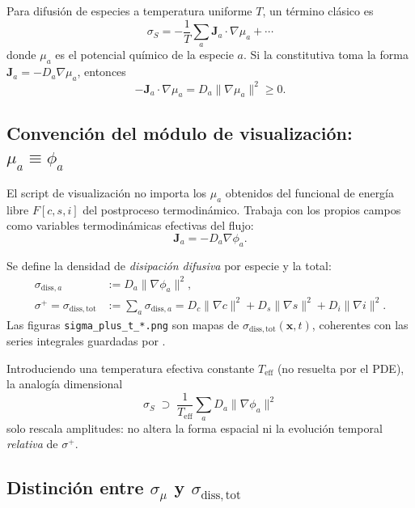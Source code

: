 \documentclass[11pt,a4paper]{article}
\newcommand{\vect}[1]{\mathbf{#1}}
\begin{document}
Para difusión de especies a temperatura uniforme $T$, un término clásico es
\begin{equation}
\label{eq:sigmaS-diff}
\sigma_S = -\frac{1}{T}\sum_a \vect{J}_a\cdot\nabla\mu_a + \cdots
\end{equation}
donde $\mu_a$ es el potencial químico de la especie $a$. Si la constitutiva toma
la forma $\vect{J}_a=-D_a\nabla\mu_a$, entonces
\begin{equation}
\label{eq:Ja-mu}
-\vect{J}_a\cdot\nabla\mu_a = D_a \lVert\nabla\mu_a\rVert^2 \ge 0 .
\end{equation}

\subsection{Convención del módulo de visualización: $\mu_a\equiv\phi_a$}

El script de visualización no importa los $\mu_a$ obtenidos del funcional de
energía libre $F[c,s,i]$ del postproceso termodinámico. Trabaja con los propios
campos como variables termodinámicas efectivas del flujo:
\begin{equation}
\label{eq:Ja-phi}
\vect{J}_a = -D_a \nabla \phi_a .
\end{equation}

Se define la densidad de \emph{disipación difusiva} por especie y la total:
\begin{align}
\label{eq:sigma-diss-a}
\sigma_{\mathrm{diss},a} &:= D_a \lVert\nabla\phi_a\rVert^2 ,\\
\label{eq:sigma-plus}
\sigma^{+} = \sigma_{\mathrm{diss,tot}}
&:= \sum_a \sigma_{\mathrm{diss},a}
= D_c\lVert\nabla c\rVert^2 + D_s\lVert\nabla s\rVert^2 + D_i\lVert\nabla i\rVert^2 .
\end{align}
Las figuras \texttt{sigma\_plus\_t\_*.png} son mapas de $\sigma_{\mathrm{diss,tot}}(\vect{x},t)$,
coherentes con las series integrales guardadas por
.

Introduciendo una temperatura efectiva constante $T_{\mathrm{eff}}$ (no
resuelta por el PDE), la analogía dimensional
\begin{equation}
\label{eq:sigmaS-supset}
\sigma_S \;\supset\; \frac{1}{T_{\mathrm{eff}}}\sum_a D_a\lVert\nabla\phi_a\rVert^2
\end{equation}
solo rescala amplitudes: no altera la forma espacial ni la evolución temporal
\emph{relativa} de $\sigma^{+}$.

\subsection{Distinción entre $\sigma_\mu$ y $\sigma_{\mathrm{diss,tot}}$}
\end{document}
